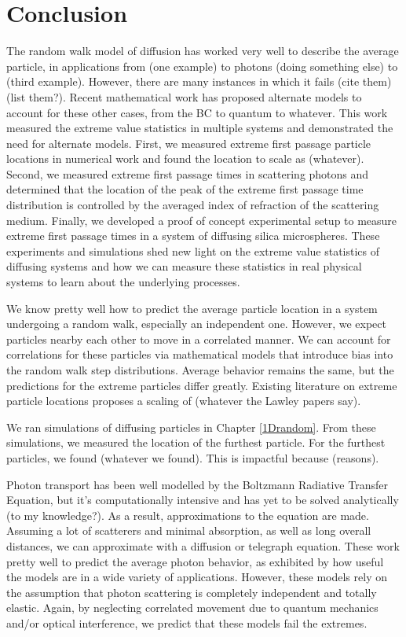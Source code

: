 \chapter{Conclusion}

The random walk model of diffusion has worked very well to describe the average particle, in applications from (one example) to photons (doing something else) to (third example). However, there are many instances in which it fails (cite them) (list them?). Recent mathematical work has proposed alternate models to account for these other cases, from the BC to quantum to whatever. This work measured the extreme value statistics in multiple systems and demonstrated the need for alternate models. First, we measured extreme first passage particle locations in numerical work and found the location to scale as (whatever). Second, we measured extreme first passage times in scattering photons and determined that the location of the peak of the extreme first passage time distribution is controlled by the averaged index of refraction of the scattering medium. Finally, we developed a proof of concept experimental setup to measure extreme first passage times in a system of diffusing silica microspheres. These experiments and simulations shed new light on the extreme value statistics of diffusing systems and how we can measure these statistics in real physical systems to learn about the underlying processes.

We know pretty well how to predict the average particle location in a system undergoing a random walk, especially an independent one. However, we expect particles nearby each other to move in a correlated manner. We can account for correlations for these particles via mathematical models that introduce bias into the random walk step distributions. Average behavior remains the same, but the predictions for the extreme particles differ greatly. Existing literature on extreme particle locations proposes a scaling of (whatever the Lawley papers say). 

We ran simulations of diffusing particles in Chapter \ref{1Drandom}. From these simulations, we measured the location of the furthest particle. For the furthest particles, we found (whatever we found). This is impactful because (reasons). 

Photon transport has been well modelled by the Boltzmann Radiative Transfer Equation, but it's computationally intensive and has yet to be solved analytically (to my knowledge?). As a result, approximations to the equation are made. Assuming a lot of scatterers and minimal absorption, as well as long overall distances, we can approximate with a diffusion or telegraph equation. These work pretty well to predict the average photon behavior, as exhibited by how useful the models are in a wide variety of applications. However, these models rely on the assumption that photon scattering is completely independent and totally elastic. Again, by neglecting correlated movement due to quantum mechanics and/or optical interference, we predict that these models fail the extremes.

